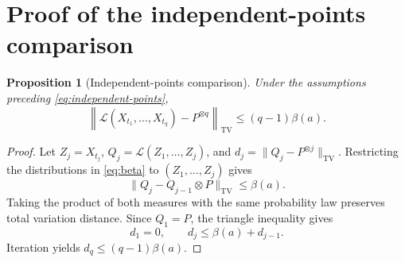 \documentclass[11pt,twoside]{article}
\newcommand{\TV}{\mathrm{TV}}
\newtheorem{proposition}[theorem]{Proposition}
\theoremstyle{definition}
\theoremstyle{remark}
\begin{document}
\section{Proof of the independent-points comparison}
\label{app:mixing-proof}

\begin{proposition}[Independent-points comparison]
Under the assumptions preceding \cref{eq:independent-points},
\[
 \left\|\mathcal L(X_{t_1},\ldots,X_{t_q})-P^{\otimes q}\right\|_{\TV}
 \leq(q-1)\beta(a).
\]
\end{proposition}

\begin{proof}
Let \(Z_j=X_{t_j}\),
\(Q_j=\mathcal L(Z_1,\ldots,Z_j)\), and
\(d_j=\|Q_j-P^{\otimes j}\|_{\TV}\). Restricting the distributions in
\cref{eq:beta} to \((Z_1,\ldots,Z_j)\) gives
\[
 \|Q_j-Q_{j-1}\otimes P\|_{\TV}\leq\beta(a).
\]
Taking the product of both measures with the same probability law preserves
total variation distance. Since \(Q_1=P\), the triangle inequality gives
\[
 d_1=0,
 \qquad
 d_j\leq\beta(a)+d_{j-1}.
\]
Iteration yields \(d_q\leq(q-1)\beta(a)\).
\end{proof}
\end{document}
